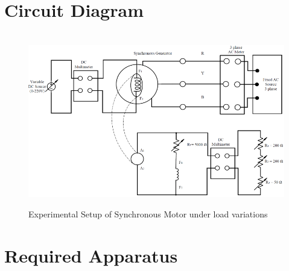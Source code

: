 \documentclass[a4paper,12pt]{article}
\begin{document}
\section{Circuit Diagram}
\begin{figure}[H]
	\centering
	\	\includegraphics[width=1\textwidth]{Images/1}
	\caption{Experimental Setup of Synchronous Motor under load variations}
	
\end{figure}



	\newpage
	\section{Required Apparatus}
	
\end{document}
